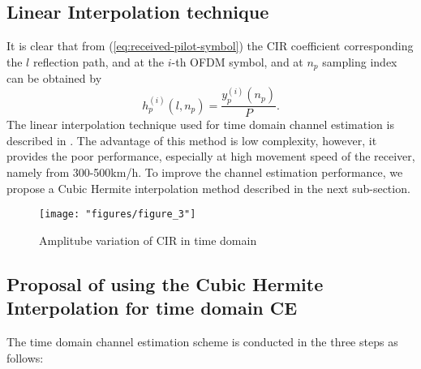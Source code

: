 \documentclass[AMA]{WileyNJD-v1}
\begin{document}
\subsection{Linear Interpolation technique}
It is clear that from (\ref{eq:received-pilot-symbol}) the CIR coefficient corresponding the $l$ reflection path, and at the $i$-th OFDM symbol, and  at $n_p$ sampling index  can be obtained by
%
\begin{equation}\label{eq:CIR-at-pilot}
	h^{(i)}_{p}(l,n_p)= \dfrac{y^{(i)}_{p}(n_p)}{P}.
\end{equation}
%
The linear interpolation technique used for time domain channel estimation is described in \cite{Jeon1999}. The advantage of this method is low complexity, however, it provides the poor performance, especially at high movement speed of the receiver, namely from 300-500km/h. To improve the channel estimation performance, we propose a Cubic Hermite interpolation method described in the next sub-section.
%
	\begin{figure}
		\centering
		\texttt{[image: "figures/figure\_3"]}
		\caption{Amplitube variation of CIR  in time domain}
		\label{fig:cir-variation}
	\end{figure}
	
	
\subsection{Proposal of using the Cubic Hermite Interpolation for time domain CE}
	
The time domain  channel estimation scheme  is conducted in the three steps as follows:
	
\end{document}
